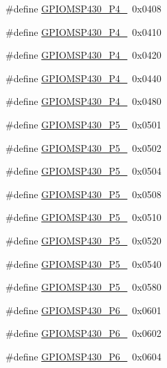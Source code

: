 \begin{DoxyCompactItemize}
\#define \hyperlink{_g_p_i_o_m_s_p430_8h_aaeb730e44ca572b5cbf8aa3d2229a41f}{G\+P\+I\+O\+M\+S\+P430\+\_\+\+P4\+\_}~0x0408
\item 
\#define \hyperlink{_g_p_i_o_m_s_p430_8h_a904857f1f4b441fc2dbc393fd59a9ff0}{G\+P\+I\+O\+M\+S\+P430\+\_\+\+P4\+\_}~0x0410
\item 
\#define \hyperlink{_g_p_i_o_m_s_p430_8h_afda6fecaf8de56721625c8756c2e8518}{G\+P\+I\+O\+M\+S\+P430\+\_\+\+P4\+\_}~0x0420
\item 
\#define \hyperlink{_g_p_i_o_m_s_p430_8h_a18f429158fbcf4a53ff0bd0b6dc4549e}{G\+P\+I\+O\+M\+S\+P430\+\_\+\+P4\+\_}~0x0440
\item 
\#define \hyperlink{_g_p_i_o_m_s_p430_8h_a50f77a38b854679891562e99a37c685d}{G\+P\+I\+O\+M\+S\+P430\+\_\+\+P4\+\_}~0x0480
\item 
\#define \hyperlink{_g_p_i_o_m_s_p430_8h_a3561434ddfddc0de685228015c559f92}{G\+P\+I\+O\+M\+S\+P430\+\_\+\+P5\+\_}~0x0501
\item 
\#define \hyperlink{_g_p_i_o_m_s_p430_8h_ae6b3efd14c70ff9f9eb600420271966d}{G\+P\+I\+O\+M\+S\+P430\+\_\+\+P5\+\_}~0x0502
\item 
\#define \hyperlink{_g_p_i_o_m_s_p430_8h_a29f5b0ba5f45bef486dc3531483ce30b}{G\+P\+I\+O\+M\+S\+P430\+\_\+\+P5\+\_}~0x0504
\item 
\#define \hyperlink{_g_p_i_o_m_s_p430_8h_a68e8be2549d3e6a335bdb815ace03099}{G\+P\+I\+O\+M\+S\+P430\+\_\+\+P5\+\_}~0x0508
\item 
\#define \hyperlink{_g_p_i_o_m_s_p430_8h_a83fb666d975a877a0711844a978684b0}{G\+P\+I\+O\+M\+S\+P430\+\_\+\+P5\+\_}~0x0510
\item 
\#define \hyperlink{_g_p_i_o_m_s_p430_8h_aa52d8f77ec784a5aa418c460c85965bc}{G\+P\+I\+O\+M\+S\+P430\+\_\+\+P5\+\_}~0x0520
\item 
\#define \hyperlink{_g_p_i_o_m_s_p430_8h_ac23fdcfda33776937acfb64b8530509d}{G\+P\+I\+O\+M\+S\+P430\+\_\+\+P5\+\_}~0x0540
\item 
\#define \hyperlink{_g_p_i_o_m_s_p430_8h_a25803ec70253da6da59f54830d9976b4}{G\+P\+I\+O\+M\+S\+P430\+\_\+\+P5\+\_}~0x0580
\item 
\#define \hyperlink{_g_p_i_o_m_s_p430_8h_a69e01854a213895127a1be34d8f5768c}{G\+P\+I\+O\+M\+S\+P430\+\_\+\+P6\+\_}~0x0601
\item 
\#define \hyperlink{_g_p_i_o_m_s_p430_8h_a49987fbc14de1e0f4e6643c6ee9d3b78}{G\+P\+I\+O\+M\+S\+P430\+\_\+\+P6\+\_}~0x0602
\item 
\#define \hyperlink{_g_p_i_o_m_s_p430_8h_a546a2d7291fab202b698350c6a94f0e0}{G\+P\+I\+O\+M\+S\+P430\+\_\+\+P6\+\_}~0x0604

\end{DoxyCompactItemize}
